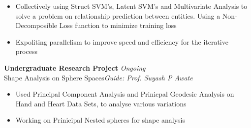 \documentclass{article}
\begin{document}
\vspace{-17pt}
\begin{itemize}[itemsep = -0.75 mm, leftmargin=*]
	\item Collectively using Struct SVM's, Latent SVM's and Multivariate Analysis to solve a problem on relationship prediction between entities. Using a Non-Decomposible Loss function to minimize training loss    
    \item Expoliting parallelism to improve speed and efficiency for the iterative process 
\end{itemize}
\textbf{Undergraduate Research Project} \hfill{\sl \small Ongoing}\\
Shape Analysis on Sphere Spaces\hfill{\sl \small Guide: Prof. Suyash P Awate}\\
\vspace{-17pt}
\begin{itemize}[itemsep = -0.75 mm, leftmargin=*]
	\item Used Principal Component Analysis and Prinicpal Geodesic Analysis on Hand and Heart Data Sets, to analyse various variations
    \item Working on Prinicipal Nested spheres for shape analysis
\end{itemize}
\vspace{-17pt}
\end{document}
